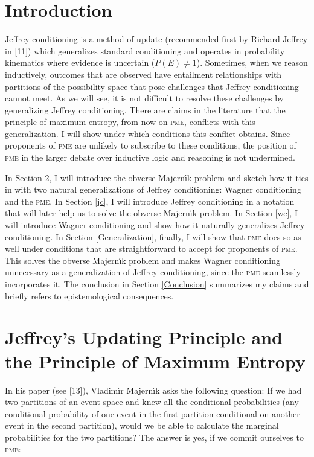 \section{Introduction}
\label{Introduction}

Jeffrey conditioning is a method of update (recommended first by
Richard Jeffrey in [11]) which generalizes standard conditioning and
operates in probability kinematics where evidence is uncertain
($P(E)\neq{}1$). Sometimes, when we reason inductively, outcomes that
are observed have entailment relationships with partitions of the
possibility space that pose challenges that Jeffrey conditioning
cannot meet. As we will see, it is not difficult to resolve these
challenges by generalizing Jeffrey conditioning. There are claims in
the literature that the principle of maximum entropy, from now on
\textsc{pme}, conflicts with this generalization. I will show under
which conditions this conflict obtains. Since proponents of
\textsc{pme} are unlikely to subscribe to these conditions, the
position of \textsc{pme} in the larger debate over inductive logic and
reasoning is not undermined.

In Section \ref{juppme}, I will introduce the obverse Majern{\'\i}k
problem and sketch how it ties in with two natural generalizations of
Jeffrey conditioning: Wagner conditioning and the \textsc{pme}. In
Section \ref{jc}, I will introduce Jeffrey conditioning in a notation
that will later help us to solve the obverse Majern{\'\i}k problem. In
Section \ref{wc}, I will introduce Wagner conditioning and show how it
naturally generalizes Jeffrey conditioning. In Section
\ref{Generalization}, finally, I will show that \textsc{pme} does so
as well under conditions that are straightforward to accept for
proponents of \textsc{pme}. This solves the obverse Majern{\'\i}k
problem and makes Wagner conditioning unnecessary as a generalization
of Jeffrey conditioning, since the \textsc{pme} seamlessly
incorporates it. The conclusion in Section \ref{Conclusion} summarizes
my claims and briefly refers to epistemological consequences.

\section{Jeffrey's Updating Principle and the Principle of Maximum Entropy}
\label{juppme}

In his paper  (see [13]), Vladim{\'\i}r Majern{\'\i}k
asks the following question: If we had two partitions of an event
space and knew all the conditional probabilities (any conditional
probability of one event in the first partition conditional on another
event in the second partition), would we be able to calculate the
marginal probabilities for the two partitions? The answer is yes, if
we commit ourselves to \textsc{pme}:

